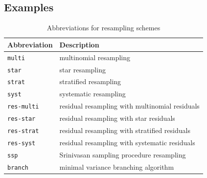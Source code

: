 \subsection{Examples \seb{$\checkmark$} }
\label{sec:examples_resamplingschemes}

\begin{table}[ht]
\centering
\begin{tabular}{ l l }
\hline\hline
Abbreviation & Description \\%
\hline
\texttt{multi} & multinomial resampling \\%
\texttt{star} & star resampling \\%
\texttt{strat} & stratified resampling \\%
\texttt{syst} & systematic resampling \\%
\texttt{res-multi} & residual resampling with multinomial residuals \\
\texttt{res-star} & residual resampling with star residuals \\
\texttt{res-strat} & residual resampling with stratified residuals \\
\texttt{res-syst} & residual resampling with systematic residuals \\
\texttt{ssp} & Srinivasan sampling procedure resampling \\%
\texttt{branch} & minimal variance branching algorithm \\%
\hline\hline
\end{tabular}
\caption{Abbreviations for resampling schemes}
\label{tab:resampling_abbrevs}
\end{table} 


 
